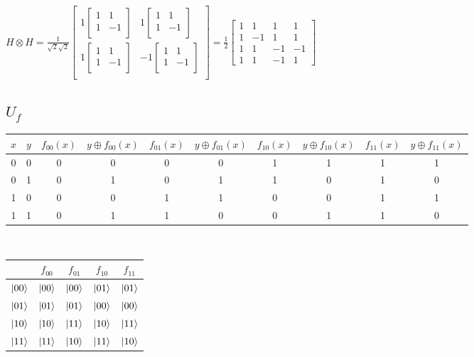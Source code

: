 \documentclass{iansnotes}
\begin{document}
$H \otimes H = \frac{1}{\sqrt{2}\sqrt{2}} \begin{bmatrix}
  1 \begin{bmatrix} 1 & 1 \\ 1 & -1 \\ \end{bmatrix} & 1 \begin{bmatrix} 1 & 1 \\ 1 & -1 \\ \end{bmatrix} \\[5mm]
  1 \begin{bmatrix} 1 & 1 \\ 1 & -1 \\ \end{bmatrix} & -1 \begin{bmatrix} 1 & 1 \\ 1 & -1 \\ \end{bmatrix} \\
\end{bmatrix} = \frac{1}{2} \begin{bmatrix} 1 & 1 & 1 & 1 \\ 1 & -1 & 1 & 1 \\ 1 & 1 & -1 & -1 \\ 1 & 1 & -1 & 1 \end{bmatrix}$



\subsection{$U_f$}

\begin{tabular}{cc|cc|cc|cc|cc}
  { \footnotesize $x$ } & { \footnotesize $y$ } & { \footnotesize $f_{00}(x)$ } & { \footnotesize $y \oplus f_{00}(x)$ } & { \footnotesize $f_{01}(x)$ }& { \footnotesize $y \oplus f_{01}(x)$ } & { \footnotesize $f_{10}(x)$ } & { \footnotesize $y \oplus f_{10}(x)$ } & { \footnotesize $f_{11}(x)$ } & { \footnotesize$y \oplus f_{11}(x)$ } \\
  \midrule
  0 & 0 & 0 & 0 & 0 & 0 & 1 & 1 & 1 & 1 \\
  0 & 1 & 0 & 1 & 0 & 1 & 1 & 0 & 1 & 0 \\
  1 & 0 & 0 & 0 & 1 & 1 & 0 & 0 & 1 & 1 \\
  1 & 1 & 0 & 1 & 1 & 0 & 0 & 1 & 1 & 0 \\
\end{tabular} \\[12mm]
\noindent \begin{tabular}{c|cccc}
           & $f_{00}$ & $f_{01}$ & $f_{10}$ & $f_{11}$ \\
  \midrule
  $\ket{00}$ & $\ket{00}$ & $\ket{00}$ & $\ket{01}$ & $\ket{01}$ \\
  $\ket{01}$ & $\ket{01}$ & $\ket{01}$ & $\ket{00}$ & $\ket{00}$ \\
  $\ket{10}$ & $\ket{10}$ & $\ket{11}$ & $\ket{10}$ & $\ket{11}$ \\
  $\ket{11}$ & $\ket{11}$ & $\ket{10}$ & $\ket{11}$ & $\ket{10}$ \\ 
\end{tabular}\\[16mm]
\end{document}
